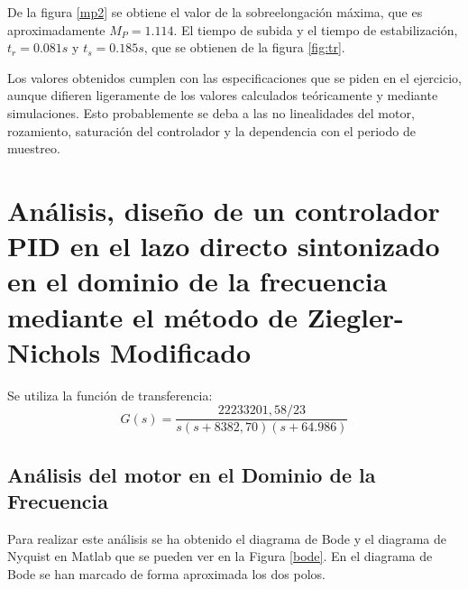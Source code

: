 \documentclass[a4paper]{article}
\begin{document}
De la figura \ref{mp2} se obtiene el valor de la sobreelongación máxima, que es aproximadamente $M_P=1.114$. El tiempo de subida y el tiempo de estabilización, $t_r=0.081 s$ y $t_s=0.185 s$, que se obtienen de la figura \ref{fig:tr}.

Los valores obtenidos cumplen con las especificaciones que se piden en el ejercicio, aunque difieren ligeramente de los valores calculados teóricamente y mediante simulaciones. Esto probablemente se deba a las no linealidades del motor, rozamiento, saturación del controlador y la dependencia con el periodo de muestreo.

\section{Análisis, diseño de un controlador PID en el lazo directo sintonizado en el dominio de la frecuencia mediante el método de Ziegler-Nichols Modificado}
Se utiliza la función de transferencia:
\begin{equation}
G(s)=\frac{22233201,58/23}{s(s+8382,70)(s+64.986)}
\end{equation}
\subsection{Análisis del motor en el Dominio de la Frecuencia}
Para realizar este análisis se ha obtenido el diagrama de Bode y el diagrama de Nyquist en Matlab que se pueden ver en la Figura \ref{bode}. En el diagrama de Bode se han marcado de forma aproximada los dos polos.
\end{document}
